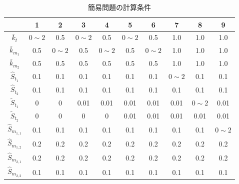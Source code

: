 \documentclass[a4paper,11pt,titlepage,uplatex]{jsreport}
\begin{document}
\begin{table}[H]
  \centering
  \caption{簡易問題の計算条件}
  \begin{tabular}{|c||c|c|c|c|c|c|c|c|c|}
  \hline
                    & 1          & 2          & 3          & 4          & 5          & 6          & 7          & 8          & 9          \\ \hline \hline
  $\bar{k}_{t}$    & $0 \sim 2$ & 0.5        & $0 \sim 2$ & 0.5        & $0 \sim 2$ & 0.5        & 1.0        & 1.0        & 1.0        \\ \hline
  $\bar{k}_{m_1}$   & 0.5        & $0 \sim 2$ & 0.5        & $0 \sim 2$ & 0.5        & $0 \sim 2$ & 1.0        & 1.0        & 1.0        \\ \hline
  $\bar{k}_{m_2}$   & 0.5        & 0.5        & 0.5        & 0.5        & 0.5        & 0.5        & 1.0        & 1.0        & 1.0        \\ \hline
  $\hat{S}_{t_{1}}$   & 0.1        & 0.1        & 0.1        & 0.1        & 0.1        & 0.1        & $0 \sim 2$ & 0.1        & 0.1        \\ \hline
  $\hat{S}_{t_{2}}$   & 0.1        & 0.1        & 0.1        & 0.1        & 0.1        & 0.1        & 0.1        & 0.1        & 0.1        \\ \hline
  $\tilde{S}_{t_{1}}$ & 0          & 0          & 0.01       & 0.01       & 0.01       & 0.01       & 0.01       & $0 \sim 2$ & 0.01       \\ \hline
  $\tilde{S}_{t_{2}}$ & 0          & 0          & 0          & 0          & 0.01       & 0.01       & 0.01       & 0.01       & 0.01       \\ \hline
  $\hat{S}_{m_{1,1}}$  & 0.1        & 0.1        & 0.1        & 0.1        & 0.1        & 0.1        & 0.1        & 0.1        & $0 \sim 2$ \\ \hline
  $\hat{S}_{m_{1,2}}$  & 0.2        & 0.2        & 0.2        & 0.2        & 0.2        & 0.2        & 0.2        & 0.2        & 0.2        \\ \hline
  $\hat{S}_{m_{2,1}}$  & 0.2        & 0.2        & 0.2        & 0.2        & 0.2        & 0.2        & 0.2        & 0.2        & 0.2        \\ \hline
  $\hat{S}_{m_{2,2}}$  & 0.1        & 0.1        & 0.1        & 0.1        & 0.1        & 0.1        & 0.1        & 0.1        & 0.1        \\ \hline
  \end{tabular}
  \label{table:5}
\end{table}
\end{document}
